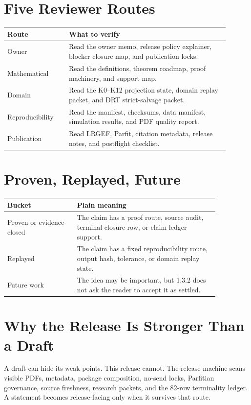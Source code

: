 \documentclass[11pt,a4paper]{article}
\begin{document}
\section*{Five Reviewer Routes}
\begin{longtable}{>{\raggedright\arraybackslash}p{0.25\linewidth}>{\raggedright\arraybackslash}p{0.65\linewidth}}
\textbf{Route} & \textbf{What to verify}\\
\hline
Owner & Read the owner memo, release policy explainer, blocker closure map, and publication locks.\\
Mathematical & Read the definitions, theorem roadmap, proof machinery, and support map.\\
Domain & Read the K0--K12 projection state, domain replay packet, and DRT strict-salvage packet.\\
Reproducibility & Read the manifest, checksums, data manifest, simulation results, and PDF quality report.\\
Publication & Read LRGEF, Parfit, citation metadata, release notes, and postflight checklist.\\
\end{longtable}

\section*{Proven, Replayed, Future}
\begin{longtable}{>{\raggedright\arraybackslash}p{0.28\linewidth}>{\raggedright\arraybackslash}p{0.58\linewidth}}
\textbf{Bucket} & \textbf{Plain meaning}\\
\hline
Proven or evidence-closed & The claim has a proof route, source audit, terminal closure row, or claim-ledger support.\\
Replayed & The claim has a fixed reproducibility route, output hash, tolerance, or domain replay state.\\
Future work & The idea may be important, but 1.3.2 does not ask the reader to accept it as settled.\\
\end{longtable}

\section*{Why the Release Is Stronger Than a Draft}
A draft can hide its weak points. This release cannot. The release machine scans visible PDFs, metadata, package composition, no-send locks, Parfitian governance, source freshness, research packets, and the 82-row terminality ledger. A statement becomes release-facing only when it survives that route.
\end{document}
